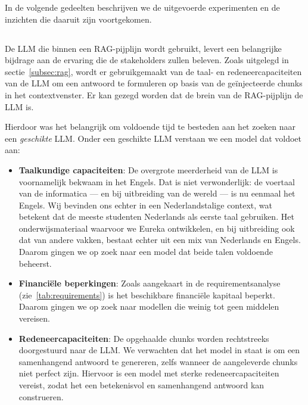 In de volgende gedeelten beschrijven we de uitgevoerde experimenten en de inzichten die daaruit zijn voortgekomen.


\subsection{}%
\label{subsec:LLM-ontdekking}

De \acrshort{LLM} die binnen een RAG-pijplijn wordt gebruikt, levert een belangrijke bijdrage aan de ervaring die de stakeholders zullen beleven. Zoals uitgelegd in sectie~\ref{subsec:rag}, wordt er gebruikgemaakt van de taal- en redeneercapaciteiten van de \acrshort{LLM} om een antwoord te formuleren op basis van de geïnjecteerde chunks in het contextvenster. Er kan gezegd worden dat de brein van de RAG-pijplijn de \acrshort{LLM} is.

Hierdoor was het belangrijk om voldoende tijd te besteden aan het zoeken naar een \emph{geschikte} \acrshort{LLM}. Onder een geschikte \acrshort{LLM} verstaan we een model dat voldoet aan:

\begin{itemize}
    \item \textbf{Taalkundige capaciteiten}: De overgrote meerderheid van de \acrlong{LLM} is voornamelijk bekwaam in het Engels. Dat is niet verwonderlijk: de voertaal van de informatica — en bij uitbreiding van de wereld — is nu eenmaal het Engels. Wij bevinden ons echter in een Nederlandstalige context, wat betekent dat de meeste studenten Nederlands als eerste taal gebruiken. Het onderwijsmateriaal waarvoor we Eureka ontwikkelen, en bij uitbreiding ook dat van andere vakken, bestaat echter uit een mix van Nederlands en Engels. Daarom gingen we op zoek naar een model dat beide talen voldoende beheerst.
    \item \textbf{Financiële beperkingen}: Zoals aangekaart in de requirementsanalyse (zie~\ref{tab:requirements}) is het beschikbare financiële kapitaal beperkt. Daarom gingen we op zoek naar modellen die weinig tot geen middelen vereisen.
    \item \textbf{Redeneercapaciteiten}: De opgehaalde chunks worden rechtstreeks doorgestuurd naar de \acrshort{LLM}. We verwachten dat het model in staat is om een samenhangend antwoord te genereren, zelfs wanneer de aangeleverde chunks niet perfect zijn. Hiervoor is een model met sterke redeneercapaciteiten vereist, zodat het een betekenisvol en samenhangend antwoord kan construeren.
\end{itemize}


